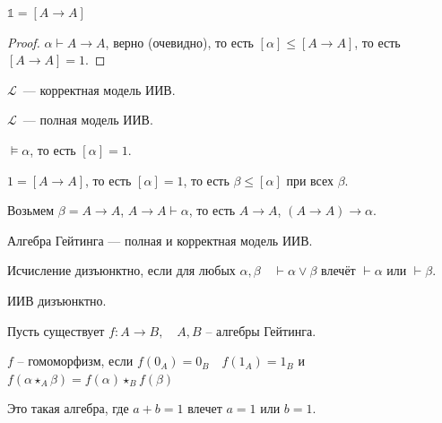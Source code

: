 \begin{lemma}
    $\mathds{1} = [A \to A]$
\end{lemma}

\begin{proof}
    $\alpha \vdash A \to A$, верно (очевидно), то есть $[\alpha] \leqslant [A \to A]$, то есть $[A \to A] = 1$.
\end{proof}

\begin{theorem}
    $\mathcal{L}$~--- корректная модель ИИВ.
\end{theorem}

\begin{theorem}
    $\mathcal{L}$~--- полная модель ИИВ.

\end{theorem}

\begin{theorem}
    $\vDash \alpha$, то есть $[\alpha] = 1$.

    $1 = [A \to A]$, то есть $[\alpha] =1$, то есть $\beta \leqslant [\alpha]$ при всех $\beta$.
    
    Возьмем $\beta = A \to A$, $A \to A \vdash \alpha$, то есть $A \to A$, $(A \to A) \to \alpha$.

\end{theorem}

\begin{theorem}
    Алгебра Гейтинга --- полная и корректная модель ИИВ.
\end{theorem}

\begin{definition}
    Исчисление дизъюнктно, если для любых $\alpha, \beta\quad \vdash \alpha \lor \beta$ влечёт $\vdash \alpha$ или $\vdash \beta$.
\end{definition}

\begin{theorem}
    ИИВ дизъюнктно.
\end{theorem}

\begin{definition}
    Пусть существует $f: A \to B, \quad A, B$ -- алгебры Гейтинга.    

    $f$ -- гомоморфизм, если $f(0_A) = 0_B\quad f(1_A) = 1_B$ и $f(\alpha \star_A \beta) = f(\alpha) \star_B f(\beta)$
\end{definition}

\begin{definition}   
    Это такая алгебра, где $a + b = 1$ влечет $a = 1$ или $b = 1$.
\end{definition}

